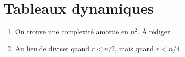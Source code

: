 \section{Tableaux dynamiques}

\begin{enumerate}[start=3]
	\item On trouve une complexité amortie en $n^2$. À rédiger.
	\item Au lieu de diviser quand $r < n / 2$, mais quand $r < n / 4$.
\end{enumerate}
